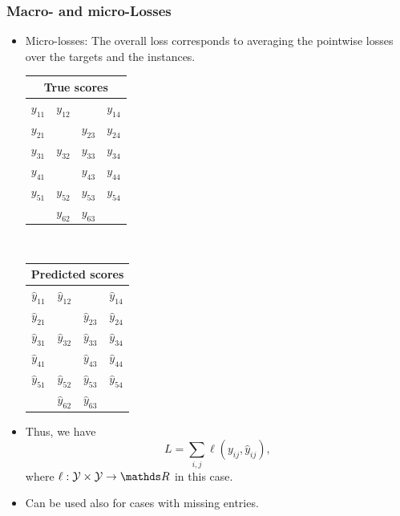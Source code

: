 \begin{frame}
	\frametitle{Macro- and micro-Losses}
	
	\begin{itemize}
		\item<1-> Micro-losses: The overall loss corresponds to averaging the pointwise losses over the targets and the instances.
		
		\begin{center}
			\begin{tabular}{|c|c|c|c|}
				\multicolumn{4}{c}{True scores} \\
				\hline
				\color{putred}$y_{11}$ & \color{putred}$y_{12}$ &   & \color{putred}$y_{14}$ \\
				\color{putred}$y_{21}$ &   & \color{putred}$y_{23}$ & \color{putred}$y_{24}$ \\
				\color{putred}$y_{31}$ & \color{putred}$y_{32}$ & \color{putred}$y_{33}$ & \color{putred}$y_{34}$ \\
				\color{putred}$y_{41}$ &   & \color{putred}$y_{43}$ & \color{putred}$y_{44}$ \\
				\color{putred}$y_{51}$ & \color{putred}$y_{52}$ & \color{putred}$y_{53}$ & \color{putred}$y_{54}$ \\
				& \color{putred}$y_{62}$ & \color{putred}$y_{63}$ &   \\
				\hline
			\end{tabular}
			$\quad$
			\begin{tabular}{|c|c|c|c|}
				\multicolumn{4}{c}{Predicted scores} \\
				\hline
				\color{putred}$\hat{y}_{11}$ & \color{putred}$\hat{y}_{12}$ &   & \color{putred}$\hat{y}_{14}$ \\
				\color{putred}$\hat{y}_{21}$ &   & \color{putred}$\hat{y}_{23}$ & \color{putred}$\hat{y}_{24}$ \\
				\color{putred}$\hat{y}_{31}$ & \color{putred}$\hat{y}_{32}$ & \color{putred}$\hat{y}_{33}$ & \color{putred}$\hat{y}_{34}$ \\
				\color{putred}$\hat{y}_{41}$ &   & \color{putred}$\hat{y}_{43}$ & \color{putred}$\hat{y}_{44}$ \\
				\color{putred}$\hat{y}_{51}$ & \color{putred}$\hat{y}_{52}$ & \color{putred}$\hat{y}_{53}$ & \color{putred}$\hat{y}_{54}$ \\
				& \color{putred}$\hat{y}_{62}$ & \color{putred}$\hat{y}_{63}$ &   \\
				\hline
			\end{tabular}
		\end{center}	
	\lz
	\item Thus, we have	
		$$
	L =  \sum_{i,j} \ell(y_{ij} , \hat{y}_{ij}),
	$$
	where $\ell: \Yspace \times \Yspace \to \R$ in this case.
%	
	\item 	
		Can be used also for cases with missing entries.
	\end{itemize}
 

	
\end{frame}




